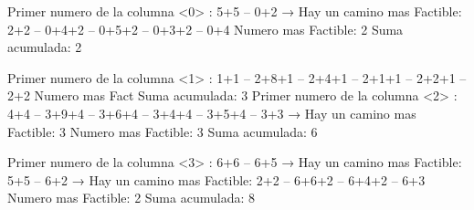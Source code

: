 \documentclass[12pt, letterpaper]{article}
\begin{document}
\begin{itemize}
            \newline
            Primer numero de la columna <0> : 5+5 -- 0+2\newline
              → Hay un camino mas Factible: 2+2 -- 0+4+2 -- 0+5+2 -- 0+3+2 -- 0+4\newline
            Numero mas Factible: 2\newline
            Suma acumulada: 2\newline\newline

            Primer numero de la columna <1> : 1+1 -- 2+8+1 -- 2+4+1 -- 2+1+1 -- 2+2+1 -- 2+2\newline
            Numero mas Fact\newline
            Suma acumulada: 3
  \newpage %
            Primer numero de la columna <2> : 4+4 -- 3+9+4 -- 3+6+4 -- 3+4+4 -- 3+5+4 -- 3+3\newline
              → Hay un camino mas Factible: 3\newline
            Numero mas Factible: 3\newline
            Suma acumulada: 6\newline\newline

            Primer numero de la columna <3> : 6+6 -- 6+5\newline
              → Hay un camino mas Factible: 5+5 -- 6+2\newline
              → Hay un camino mas Factible: 2+2 -- 6+6+2 -- 6+4+2 -- 6+3\newline
            Numero mas Factible: 2\newline
            Suma acumulada: 8\newline\newline


\end{itemize}
\end{document}
